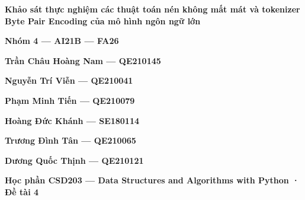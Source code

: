 \documentclass[10pt,letterpaper]{article}
\begin{document}
\begin{center}{\fontsize{18}{21}\selectfont\bfseries Khảo sát thực nghiệm các thuật toán nén không mất mát và tokenizer Byte Pair Encoding của mô hình ngôn ngữ lớn\par}\end{center}
\begin{center}\textbf{Nhóm 4 — AI21B — FA26}\end{center}
\begin{center}\textbf{Trần Châu Hoàng Nam — QE210145}\end{center}
\begin{center}\textbf{Nguyễn Trí Viễn — QE210041}\end{center}
\begin{center}\textbf{Phạm Minh Tiến — QE210079}\end{center}
\begin{center}\textbf{Hoàng Đức Khánh — SE180114}\end{center}
\begin{center}\textbf{Trương Đình Tân — QE210065}\end{center}
\begin{center}\textbf{Dương Quốc Thịnh — QE210121}\end{center}
\begin{center}\textbf{Học phần CSD203 — Data Structures and Algorithms with Python · Đề tài 4}\end{center}
\end{document}
